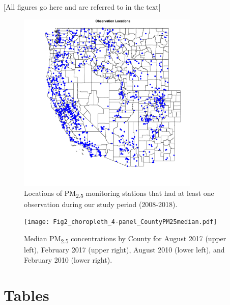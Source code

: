 \documentclass[english]{article}
\begin{document}

[All figures go here and are referred to in the text]


\begin{figure} 
\centering  
\includegraphics[width=0.77\textwidth]{Monitor_Locations.pdf} 
\caption{\label{fig:MonitorLocations}Locations of PM\textsubscript{2.5} monitoring stations that had at least one observation during our study period (2008-2018).} 
\end{figure} 



\begin{figure} 
\centering  
\texttt{[image: Fig2\_choropleth\_4-panel\_CountyPM25median.pdf]} 
\caption{\label{fig:Fig2_choropleth_4-panelCountyPM25median}Median PM\textsubscript{2.5} concentrations by County for August 2017 (upper left), February 2017 (upper right), August 2010 (lower left), and February 2010 (lower right).} 
\end{figure} 
 


\section*{Tables}
\end{document}
